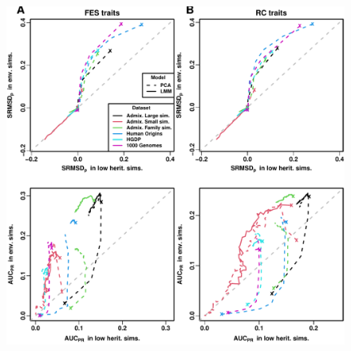 \documentclass[9pt,lineno]{elife}
\begin{document}
\begin{figure}
{  }{\includegraphics[width=\textwidth,height=0.7\textheight,keepaspectratio]{low-herit-vs-env.pdf}}
  \label{figsupp:low-herit-vs-env}
\end{figure}
\end{document}
